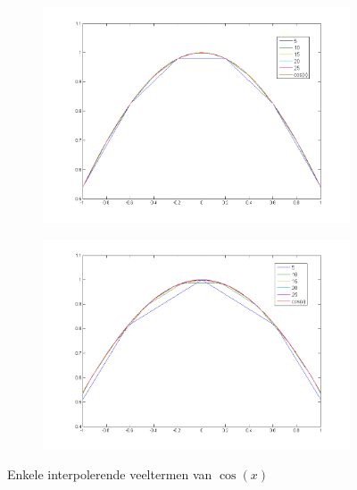 \documentclass[a4paper, 12pt, titlepage]{report}
\begin{document}
\begin{figure}[htb]
\begin{subfigure}{0.5\textwidth}
\centering
\includegraphics[width=\textwidth]{cosEqui.png}
\end{subfigure}
\begin{subfigure}{0.5\textwidth}
\centering
\includegraphics[width=\textwidth]{cosCheb.png}
\end{subfigure}

\caption{Enkele interpolerende veeltermen van $\cos(x)$}
\label{interpolcos}
\end{figure}
\end{document}
